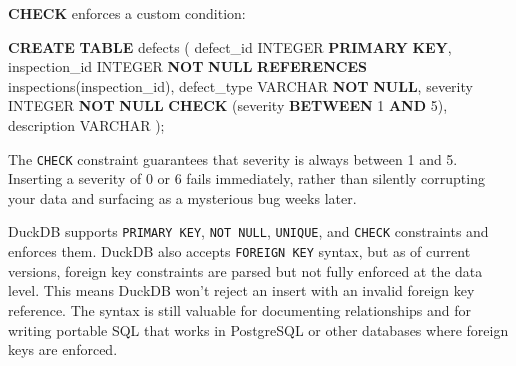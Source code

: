 \documentclass[
  letterpaper,
  DIV=11,
  numbers=noendperiod]{scrreprt}
\newenvironment{Shaded}{\begin{snugshade}}{\end{snugshade}}
\newcommand{\DataTypeTok}[1]{\textcolor[rgb]{0.68,0.00,0.00}{#1}}
\newcommand{\DecValTok}[1]{\textcolor[rgb]{0.68,0.00,0.00}{#1}}
\newcommand{\KeywordTok}[1]{\textcolor[rgb]{0.00,0.23,0.31}{\textbf{#1}}}
\newcommand{\NormalTok}[1]{\textcolor[rgb]{0.00,0.23,0.31}{#1}}
\begin{document}
\textbf{CHECK} enforces a custom condition:

\begin{codelisting}

\caption{\texttt{duckdb}}

\begin{Shaded}
\begin{Highlighting}[]
\KeywordTok{CREATE} \KeywordTok{TABLE}\NormalTok{ defects (}
\NormalTok{    defect\_id     }\DataTypeTok{INTEGER} \KeywordTok{PRIMARY} \KeywordTok{KEY}\NormalTok{,}
\NormalTok{    inspection\_id }\DataTypeTok{INTEGER} \KeywordTok{NOT} \KeywordTok{NULL} \KeywordTok{REFERENCES}\NormalTok{ inspections(inspection\_id),}
\NormalTok{    defect\_type   }\DataTypeTok{VARCHAR} \KeywordTok{NOT} \KeywordTok{NULL}\NormalTok{,}
\NormalTok{    severity      }\DataTypeTok{INTEGER} \KeywordTok{NOT} \KeywordTok{NULL} \KeywordTok{CHECK}\NormalTok{ (severity }\KeywordTok{BETWEEN} \DecValTok{1} \KeywordTok{AND} \DecValTok{5}\NormalTok{),}
\NormalTok{    description   }\DataTypeTok{VARCHAR}
\NormalTok{);}
\end{Highlighting}
\end{Shaded}

\end{codelisting}

The \texttt{CHECK} constraint guarantees that severity is always between
1 and 5. Inserting a severity of 0 or 6 fails immediately, rather than
silently corrupting your data and surfacing as a mysterious bug weeks
later.

\begin{tcolorbox}[enhanced jigsaw, opacitybacktitle=0.6, arc=.35mm, colback=white, bottomtitle=1mm, opacityback=0, toprule=.15mm, left=2mm, colbacktitle=quarto-callout-note-color!10!white, breakable, coltitle=black, toptitle=1mm, colframe=quarto-callout-note-color-frame, bottomrule=.15mm, titlerule=0mm, title=\textcolor{quarto-callout-note-color}{\faInfo}\hspace{0.5em}{DuckDB's Constraint Support}, rightrule=.15mm, leftrule=.75mm]

DuckDB supports \texttt{PRIMARY\ KEY}, \texttt{NOT\ NULL},
\texttt{UNIQUE}, and \texttt{CHECK} constraints and enforces them.
DuckDB also accepts \texttt{FOREIGN\ KEY} syntax, but as of current
versions, foreign key constraints are parsed but not fully enforced at
the data level. This means DuckDB won't reject an insert with an invalid
foreign key reference. The syntax is still valuable for documenting
relationships and for writing portable SQL that works in PostgreSQL or
other databases where foreign keys are enforced.

\end{tcolorbox}
\end{document}
